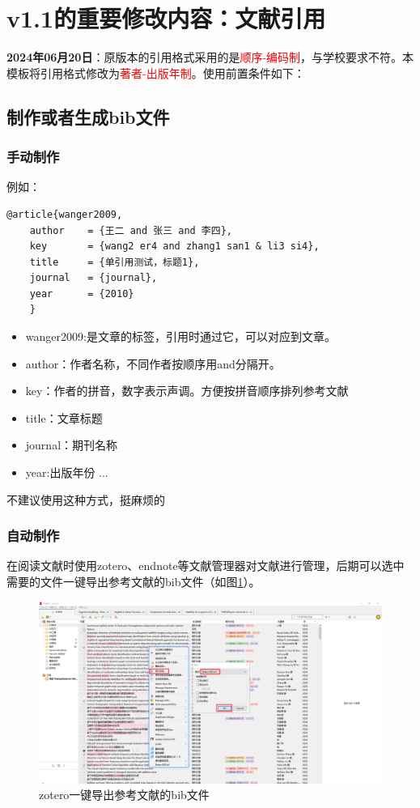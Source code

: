 \section{v1.1的重要修改内容：文献引用}
\textbf{2024年06月20日}：原版本的引用格式采用的是\textcolor{red}{顺序-编码制}，与学校要求不符。本模板将引用格式修改为\textcolor{red}{著者-出版年制}。使用前置条件如下：
\subsection{制作或者生成bib文件}

\subsubsection{手动制作}
例如：
\begin{lstlisting}
@article{wanger2009,
	author    = {王二 and 张三 and 李四},
	key       = {wang2 er4 and zhang1 san1 & li3 si4},
	title     = {单引用测试，标题1},
	journal   = {journal},
	year      = {2010}	
	}
\end{lstlisting}
\begin{itemize}
	\item wanger2009:是文章的标签，引用时通过它，可以对应到文章。
	\item author：作者名称，不同作者按顺序用and分隔开。
	\item key：作者的拼音，数字表示声调。方便按拼音顺序排列参考文献
	\item title：文章标题
	\item journal：期刊名称
	\item year:出版年份
	...
\end{itemize}
不建议使用这种方式，挺麻烦的
\subsubsection{自动制作}
在阅读文献时使用zotero、endnote等文献管理器对文献进行管理，后期可以选中需要的文件一键导出参考文献的bib文件（如图\ref{参考文献导出示意图}）。

\begin{figure}[h]
	\centering
	\includegraphics[width = 14cm]{figures/参考文献.png}
	\caption{zotero一键导出参考文献的bib文件}
	\label{参考文献导出示意图}
\end{figure}

